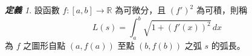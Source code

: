 \documentclass[12pt]{article}
\theoremstyle{remark}
\newtheorem{cdefi}{\bfseries 定義}
\begin{document}
\begin{cdefi}
設函數 $f:[a,b]\rightarrow{\mathbb R}$ 為可微分，且 $(f')^2$ 為可積，則稱
\[
L(s)=\int^b_a\!\sqrt{1+(f'(x))^2}\,dx
\]
為 $f$ 之圖形自點 $(a,f(a))$ 至點 $(b,f(b))$ 之弧 $s$ 的弧長。
\end{cdefi}
\end{document}
